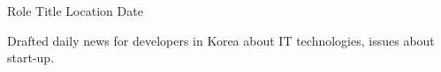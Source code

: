 

\begin{cventries}

  \cventry
  {Role} %
  {Title} %
  {Location} %
  {Date} %
  {
    \begin{cvitems} %
      \item {Drafted daily news for developers in Korea about IT technologies, issues about start-up.}
    \end{cvitems}
  }

\end{cventries}
